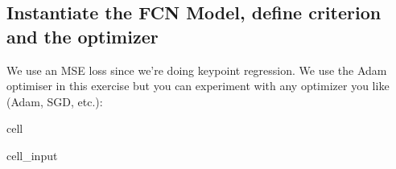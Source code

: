 \documentclass[letterpaper,10pt,english]{jupyterBook}
\begin{document}
\subsection{Instantiate the FCN Model, define criterion and the optimizer}
\label{\detokenize{04:instantiate-the-fcn-model-define-criterion-and-the-optimizer}}
\sphinxAtStartPar
We use an MSE loss since we’re doing keypoint regression. We use the Adam optimiser in this exercise but you can experiment with any optimizer you like (Adam, SGD, etc.):

\begin{sphinxuseclass}{cell}\begin{sphinxVerbatimInput}

\begin{sphinxuseclass}{cell_input}
\begin{sphinxVerbatim}[commandchars=\\\{\}]
 
  
 \PYG{p}{[}\PYG{p}{]}
  
    
   
\end{sphinxVerbatim}

\end{sphinxuseclass}\end{sphinxVerbatimInput}
\begin{sphinxVerbatimOutput}


\end{sphinxVerbatimOutput}
\end{sphinxuseclass}
\end{document}

